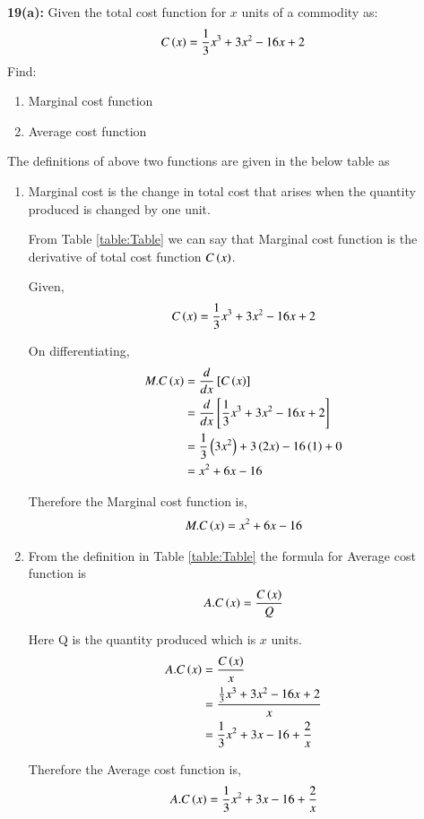\documentclass[journal,12pt,twocolumn]{IEEEtran}
\begin{document}
\textbf{19(a):} 
   Given the total cost function for $x$ units of a commodity as:
\begin{align*}
  C\left(x\right) = \frac{1}{3}x^3 + 3x^2 - 16x +2
\end{align*}
   Find:
\begin{enumerate}[ label=(\roman*)]
\item Marginal cost function
\item Average cost function
\end{enumerate}

\solution 
The definitions of above two functions are given in the below table as
\begin{table}[!htb]
\centering

\caption{}
\label{table:Table}
\end{table} 

\begin{enumerate}[ label=(\roman*)]
\item Marginal cost is the change in total cost that arises when the quantity produced is changed by one unit.

From Table
\eqref{table:Table}
we can say that Marginal cost function is the derivative of total cost function $C\left(x\right)$. 
          
Given,
\begin{align}
  C\left(x\right) = \frac{1}{3}x^3 + 3x^2 - 16x +2
\end{align}
          
On differentiating,
\begin{align}
  M.C\left(x\right) &= \frac{d}{dx} {}\left[C\left(x\right)\right]\\
              &= \frac{d}{dx} {}\left[\frac{1}{3}x^3 + 3x^2 - 16x +2\right] \\
              &= \frac{1}{3}\left(3x^2\right) + 3\left(2x\right)-16\left(1\right)+0 \\
              &= x^2+6x-16
\end{align}  
          
Therefore the Marginal cost function is,
\begin{align*}
  M.C\left(x\right)=x^2+6x-16
\end{align*}        
      
\item From the definition in Table
\eqref{table:Table}
the formula for Average cost function is
\begin{align}
  A.C\left(x\right)=\frac{C\left(x\right)}{Q}
\end{align}
         
Here Q is the quantity produced which is $x$ units.
\begin{align}
  A.C\left(x\right) &=\frac{C\left(x\right)}{x} \\
              &=\frac{\frac{1}{3}x^3 + 3x^2 - 16x +2}{x} \\
              &=\frac{1}{3}x^2 + 3x - 16 +\frac{2}{x}
\end{align}    
                  
Therefore the Average cost function is,
\begin{align*}
  A.C\left(x\right)=\frac{1}{3}x^2 + 3x - 16 +\frac{2}{x}
\end{align*}
         
\end{enumerate}
  
\end{document}

